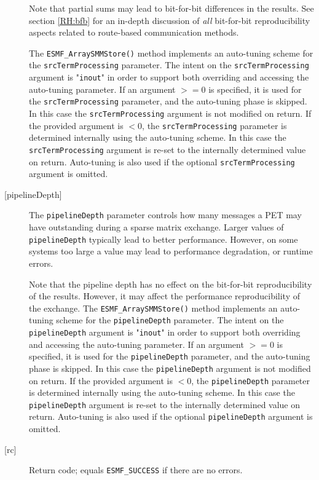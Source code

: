 \begin{description}
       Note that partial sums may lead to bit-for-bit differences in the results.
       See section \ref{RH:bfb} for an in-depth discussion of {\em all}
       bit-for-bit reproducibility aspects related to route-based communication
       methods.
  
       \begin{sloppypar}
       The {\tt ESMF\_ArraySMMStore()} method implements an auto-tuning scheme
       for the {\tt srcTermProcessing} parameter. The intent on the
       {\tt srcTermProcessing} argument is "{\tt inout}" in order to
       support both overriding and accessing the auto-tuning parameter.
       If an argument $>= 0$ is specified, it is used for the
       {\tt srcTermProcessing} parameter, and the auto-tuning phase is skipped.
       In this case the {\tt srcTermProcessing} argument is not modified on
       return. If the provided argument is $< 0$, the {\tt srcTermProcessing}
       parameter is determined internally using the auto-tuning scheme. In this
       case the {\tt srcTermProcessing} argument is re-set to the internally
       determined value on return. Auto-tuning is also used if the optional
       {\tt srcTermProcessing} argument is omitted.
       \end{sloppypar}
  
     \item [{[pipelineDepth]}]
       The {\tt pipelineDepth} parameter controls how many messages a PET
       may have outstanding during a sparse matrix exchange. Larger values
       of {\tt pipelineDepth} typically lead to better performance. However,
       on some systems too large a value may lead to performance degradation,
       or runtime errors.
  
       Note that the pipeline depth has no effect on the bit-for-bit
       reproducibility of the results. However, it may affect the performance
       reproducibility of the exchange.
       The {\tt ESMF\_ArraySMMStore()} method implements an auto-tuning scheme
       for the {\tt pipelineDepth} parameter. The intent on the
       {\tt pipelineDepth} argument is "{\tt inout}" in order to
       support both overriding and accessing the auto-tuning parameter.
       If an argument $>= 0$ is specified, it is used for the
       {\tt pipelineDepth} parameter, and the auto-tuning phase is skipped.
       In this case the {\tt pipelineDepth} argument is not modified on
       return. If the provided argument is $< 0$, the {\tt pipelineDepth}
       parameter is determined internally using the auto-tuning scheme. In this
       case the {\tt pipelineDepth} argument is re-set to the internally
       determined value on return. Auto-tuning is also used if the optional
       {\tt pipelineDepth} argument is omitted.
  
     \item [{[rc]}]
       Return code; equals {\tt ESMF\_SUCCESS} if there are no errors.
  
   \end{description}
   
